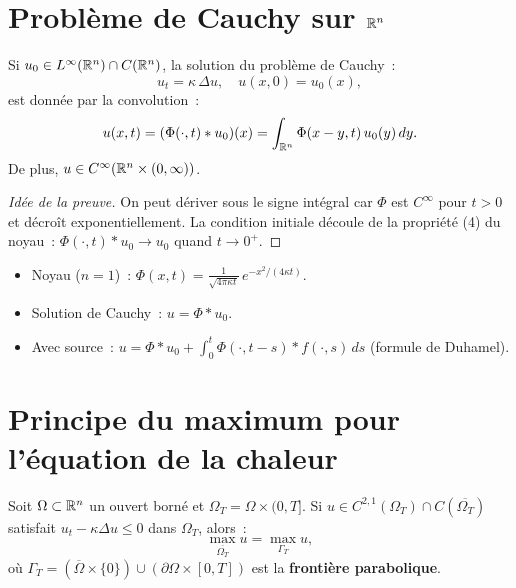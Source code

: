 \section{Probl\`eme de Cauchy sur $\mathbb{R}^n$}

\begin{theoreme}
Si $u_0 \in L^\infty(\mathbb{R}^n) \cap C(\mathbb{R}^n)$, la solution du probl\`eme de Cauchy~:
\[
    u_t = \kappa\, \Delta u, \quad u(x,0) = u_0(x),
\]
est donn\'ee par la convolution~:
\begin{equation}\label{eq:solution_cauchy_chaleur}
    u(x,t) = (\Phi(\cdot, t) * u_0)(x)
    = \int_{\mathbb{R}^n} \Phi(x-y, t)\, u_0(y)\, dy.
\end{equation}
De plus, $u \in C^\infty(\mathbb{R}^n \times (0,\infty))$.
\end{theoreme}

\begin{proof}[Id\'ee de la preuve]
On peut d\'eriver sous le signe int\'egral car $\Phi$ est $C^\infty$ pour
$t > 0$ et d\'ecro\^it exponentiellement. La condition initiale d\'ecoule
de la propri\'et\'e (4) du noyau~: $\Phi(\cdot, t) * u_0 \to u_0$
quand $t \to 0^+$.
\end{proof}

\begin{formules}[title=\textbf{\'Equation de la chaleur --- formules cl\'es}]
\begin{itemize}
    \item Noyau ($n=1$)~: $\Phi(x,t) = \frac{1}{\sqrt{4\pi\kappa t}}\, e^{-x^2/(4\kappa t)}$.
    \item Solution de Cauchy~: $u = \Phi * u_0$.
    \item Avec source~: $u = \Phi * u_0 + \int_0^t \Phi(\cdot, t-s) * f(\cdot, s)\, ds$
          (formule de Duhamel).
\end{itemize}
\end{formules}

\section{Principe du maximum pour l'\'equation de la chaleur}

\begin{theoreme}
Soit $\Omega \subset \mathbb{R}^n$ un ouvert born\'e et
$\Omega_T = \Omega \times (0,T]$. Si $u \in C^{2,1}(\Omega_T) \cap C(\overline{\Omega_T})$
satisfait $u_t - \kappa\Delta u \leq 0$ dans $\Omega_T$, alors~:
\begin{equation}\label{eq:max_faible_chaleur}
    \max_{\overline{\Omega_T}} u = \max_{\Gamma_T} u,
\end{equation}
o\`u $\Gamma_T = (\overline{\Omega} \times \{0\}) \cup (\partial\Omega \times [0,T])$
est la \textbf{fronti\`ere parabolique}.
\end{theoreme}


